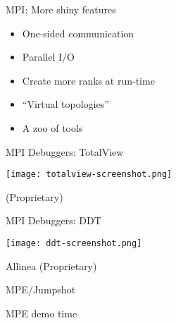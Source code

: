 \documentclass[english,compress]{beamer}
\begin{document}
\begin{frame}{MPI: More shiny features}
  \begin{itemize}
    \item One-sided communication
    \item Parallel I/O
    \item Create more ranks at run-time
    \item ``Virtual topologies''
    \item A zoo of tools
  \end{itemize}
\end{frame}
\begin{frame}{MPI Debuggers: TotalView}
  \begin{center}
  \texttt{[image: totalview-screenshot.png]}

  (Proprietary)
  \end{center}
\end{frame}
\begin{frame}{MPI Debuggers: DDT}
  \begin{center}
  \texttt{[image: ddt-screenshot.png]}

  Allinea 
  (Proprietary)
  \end{center}
\end{frame}
\begin{frame}{MPE/Jumpshot}
  \begin{center}
  \Huge MPE demo time
  \end{center}
\end{frame}
\long{}
\end{document}
